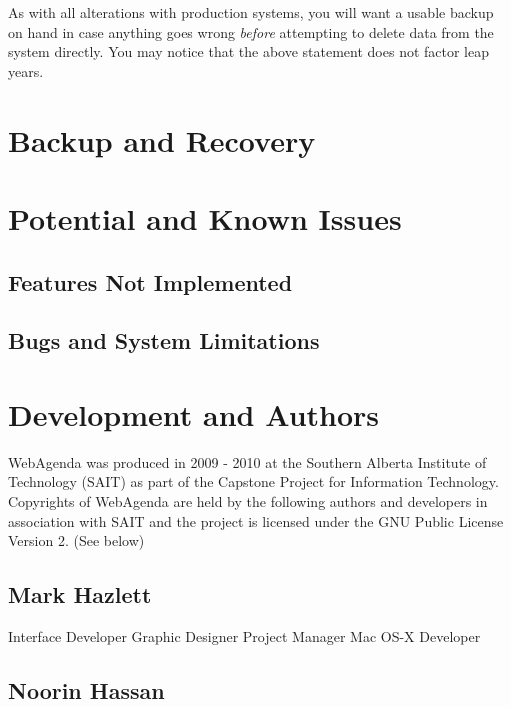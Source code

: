 \documentclass[a4paper,10pt]{report}
\begin{document}
\par \noindent \hspace*{1cm} As with all alterations with production systems, you will want a usable backup on hand in case anything goes wrong \textit{before} attempting to delete data from the system directly. You may notice that the above statement does not factor leap years.

\chapter{Backup and Recovery}

\chapter{Potential and Known Issues}

\section{Features Not Implemented}

\section{Bugs and System Limitations}

\chapter{Development and Authors}

\par \noindent \hspace*{1cm} WebAgenda \textcopyright  \space was produced in 2009 - 2010 at the Southern Alberta Institute of Technology (SAIT) as part of the Capstone Project for Information Technology. Copyrights of WebAgenda are held by the following authors and developers in association with SAIT and the project is licensed under the GNU Public License Version 2. (See below)

\section{Mark Hazlett}


Interface Developer \newline
Graphic Designer \newline
Project Manager \newline
Mac OS-X Developer

\section{Noorin Hassan}
\end{document}
